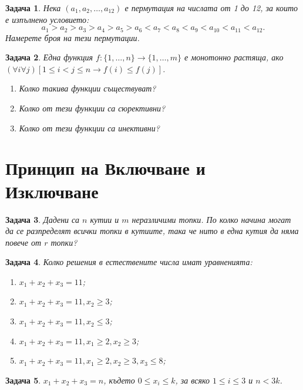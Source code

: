 \documentclass[a4paper]{article}
\newtheorem{problem}{Задача}
\begin{document}
\author{Stefan Vatev}


\begin{problem}
  Нека $(a_1,a_2,\dots,a_{12})$ е пермутация на числата от 1 до 12, за които е изпълнено условието:
  \[a_1 > a_2 > a_3 > a_4 > a_5 > a_6 < a_7 < a_8 < a_9 < a_{10} < a_{11} < a_{12}.\]
  Намерете броя на тези пермутации.  
\end{problem}

\begin{problem}
  Една функция $f:\{1,\dots,n\}\to\{1,\dots,m\}$ е монотонно растяща, ако
  $(\forall i\forall j)[1\leq i<j\leq n \rightarrow f(i)\leq f(j) ]$.
  \begin{enumerate}
  \item
    Колко такива функции съществуват?
  \item
    Колко от тези функции са сюрективни?
  \item
    Колко от тези функции са инективни?
\end{enumerate}
\end{problem}


\section{Принцип на Включване и Изключване}

\begin{problem}
  Дадени са $n$ кутии и $m$ неразличими топки.
  По колко начина могат да се разпределят всички топки в кутиите, така че нито в една кутия да няма повече от $r$ топки?
\end{problem}

\begin{problem}
  Колко решения в естествените числа имат уравненията:
  \begin{enumerate}
  \item
    $x_1+x_2+x_3 = 11$;
  \item
    $x_1 + x_2 + x_3 = 11, x_2 \geq 3$;
  \item
    $x_1+x_2+x_3 = 11, x_2 \leq 3$;
  \item
    $x_1+x_2+x_3 = 11, x_1 \geq 2, x_2 \geq 3$;
  \item
    $x_1+x_2+x_3 = 11, x_1 \geq 2, x_2 \geq 3, x_3 \leq 8$;
  \end{enumerate}
\end{problem}

\begin{problem}
  $x_1 + x_2 + x_3 = n$, където
  $0\leq x_i \leq k$, за всяко $1\leq i \leq 3$ и $n < 3k$.
\end{problem}
\end{document}
